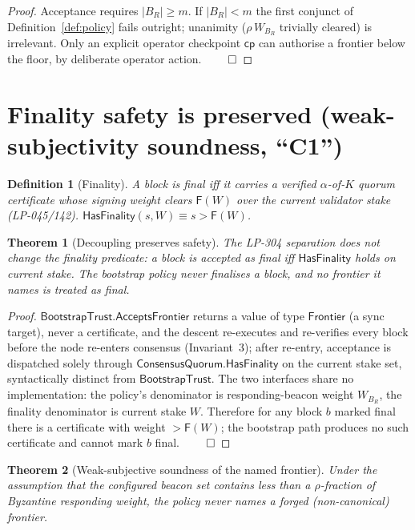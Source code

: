 \documentclass[11pt]{article}
\newtheorem{theorem}{Theorem}
\newtheorem{definition}{Definition}
\begin{document}
\begin{proof}
Acceptance requires $|B_R|\ge m$. If $|B_R|<m$ the first conjunct of
Definition~\ref{def:policy} fails outright; unanimity ($\rho\,W_{B_R}$ trivially cleared)
is irrelevant. Only an explicit operator checkpoint $\mathsf{cp}$ can authorise a frontier
below the floor, by deliberate operator action. $\qed$
\end{proof}

\section{Finality safety is preserved (weak-subjectivity soundness, ``C1'')}

\begin{definition}[Finality]
A block is \emph{final} iff it carries a verified $\alpha$-of-$K$ quorum certificate whose
signing weight clears $\mathsf{F}(W)$ over the \emph{current} validator stake (LP-045/142).
$\mathsf{HasFinality}(s,W)\equiv s>\mathsf{F}(W)$.
\end{definition}

\begin{theorem}[Decoupling preserves safety]\label{thm:safety}
The LP-304 separation does not change the finality predicate: a block is accepted as final
iff $\mathsf{HasFinality}$ holds on current stake. The bootstrap policy never finalises a
block, and no frontier it names is treated as final.
\end{theorem}

\begin{proof}
$\mathsf{BootstrapTrust.AcceptsFrontier}$ returns a value of type $\mathsf{Frontier}$ (a sync
target), never a certificate, and the descent re-executes and re-verifies every block before
the node re-enters consensus (Invariant~3); after re-entry, acceptance is dispatched solely
through $\mathsf{ConsensusQuorum.HasFinality}$ on the current stake set, syntactically distinct
from $\mathsf{BootstrapTrust}$. The two interfaces share no implementation: the policy's
denominator is responding-beacon weight $W_{B_R}$, the finality denominator is current stake
$W$. Therefore for any block $b$ marked final there is a certificate with weight $>\mathsf{F}(W)$;
the bootstrap path produces no such certificate and cannot mark $b$ final. $\qed$
\end{proof}

\begin{theorem}[Weak-subjective soundness of the named frontier]\label{thm:c1}
Under the assumption that the configured beacon set contains less than a $\rho$-fraction of
Byzantine responding weight, the policy never names a forged (non-canonical) frontier.
\end{theorem}
\end{document}

